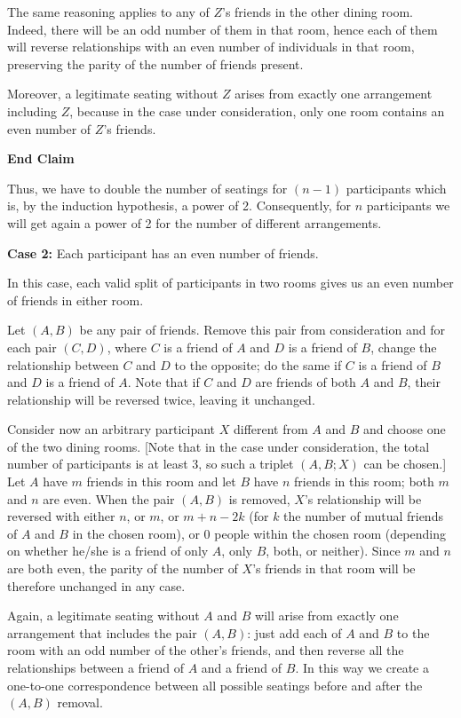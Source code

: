\begin{enumerate}
 The same reasoning applies to any of $Z$'s friends in the other dining room. Indeed, there will be an odd number of them in that room, hence each of them will reverse relationships with an even number of individuals in that room, preserving the parity of the number of friends present.

 Moreover, a legitimate seating without $Z$ arises from exactly one arrangement including $Z$, because in the case under consideration, only one room contains an even number of $Z$'s friends.

 \textbf{End Claim}

 Thus, we have to double the number of seatings for $(n - 1)$ participants which is, by the induction hypothesis, a power of 2. Consequently, for $n$ participants we will get again a power of 2 for the number of different arrangements.

 \textbf{Case 2:} Each participant has an even number of friends.

 In this case, each valid split of participants in two rooms gives us an even number of friends in either room.

 Let $(A,B)$ be any pair of friends. Remove this pair from consideration and for each pair $(C,D)$, where $C$ is a friend of $A$ and $D$ is a friend of $B$, change the relationship between $C$ and $D$ to the opposite; do the same if $C$ is a friend of $B$ and $D$ is a friend of $A$. Note that if $C$ and $D$ are friends of both $A$ and $B$, their relationship will be reversed twice, leaving it unchanged.

 Consider now an arbitrary participant $X$ different from $A$ and $B$ and choose one of the two dining rooms. [Note that in the case under consideration, the total number of participants is at least 3, so such a triplet $(A, B; X)$ can be chosen.] Let $A$ have $m$ friends in this room and let $B$ have $n$ friends in this room; both $m$ and $n$ are even. When the pair $(A, B)$ is removed, $X$'s relationship will be reversed with either $n$, or $m$, or $m + n - 2k$ (for $k$ the number of mutual friends of $A$ and $B$ in the chosen room), or 0 people within the chosen room (depending on whether he/she is a friend of only $A$, only $B$, both, or neither). Since $m$ and $n$ are both even, the parity of the number of $X$'s friends in that room will be therefore unchanged in any case.

 Again, a legitimate seating without $A$ and $B$ will arise from exactly one arrangement that includes the pair $(A, B)$: just add each of $A$ and $B$ to the room with an odd number of the other's friends, and then reverse all the relationships between a friend of $A$ and a friend of $B$. In this way we create a one-to-one correspondence between all possible seatings before and after the $(A,B)$ removal.


\end{enumerate}

